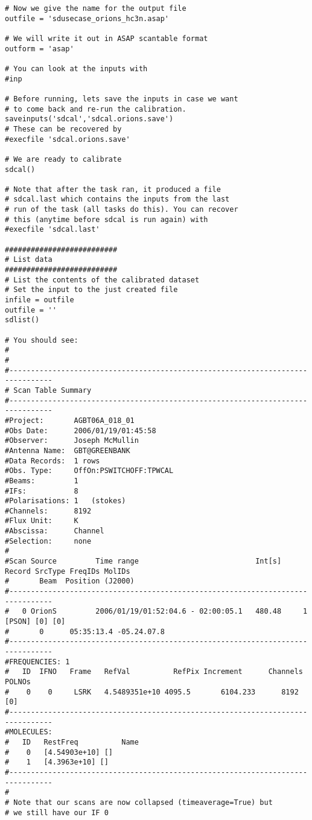 \begin{verbatim}
# Now we give the name for the output file
outfile = 'sdusecase_orions_hc3n.asap'

# We will write it out in ASAP scantable format
outform = 'asap'

# You can look at the inputs with
#inp

# Before running, lets save the inputs in case we want
# to come back and re-run the calibration.
saveinputs('sdcal','sdcal.orions.save')
# These can be recovered by
#execfile 'sdcal.orions.save'

# We are ready to calibrate
sdcal()

# Note that after the task ran, it produced a file
# sdcal.last which contains the inputs from the last
# run of the task (all tasks do this). You can recover
# this (anytime before sdcal is run again) with
#execfile 'sdcal.last'

##########################
# List data
##########################
# List the contents of the calibrated dataset
# Set the input to the just created file
infile = outfile
outfile = ''
sdlist()

# You should see:
# 
#
#--------------------------------------------------------------------------------
# Scan Table Summary
#--------------------------------------------------------------------------------
#Project:       AGBT06A_018_01
#Obs Date:      2006/01/19/01:45:58
#Observer:      Joseph McMullin
#Antenna Name:  GBT@GREENBANK
#Data Records:  1 rows
#Obs. Type:     OffOn:PSWITCHOFF:TPWCAL
#Beams:         1   
#IFs:           8   
#Polarisations: 1   (stokes)
#Channels:      8192
#Flux Unit:     K
#Abscissa:      Channel
#Selection:     none
#
#Scan Source         Time range                           Int[s] Record SrcType FreqIDs MolIDs 
#       Beam  Position (J2000)       
#--------------------------------------------------------------------------------
#   0 OrionS         2006/01/19/01:52:04.6 - 02:00:05.1   480.48     1  [PSON] [0] [0]
#       0      05:35:13.4 -05.24.07.8
#--------------------------------------------------------------------------------
#FREQUENCIES: 1
#   ID  IFNO   Frame   RefVal          RefPix Increment      Channels POLNOs
#    0    0     LSRK   4.5489351e+10 4095.5       6104.233      8192  [0]
#--------------------------------------------------------------------------------
#MOLECULES: 
#   ID   RestFreq          Name           
#    0   [4.54903e+10] []
#    1   [4.3963e+10] []
#--------------------------------------------------------------------------------
#
# Note that our scans are now collapsed (timeaverage=True) but 
# we still have our IF 0


\end{verbatim}
